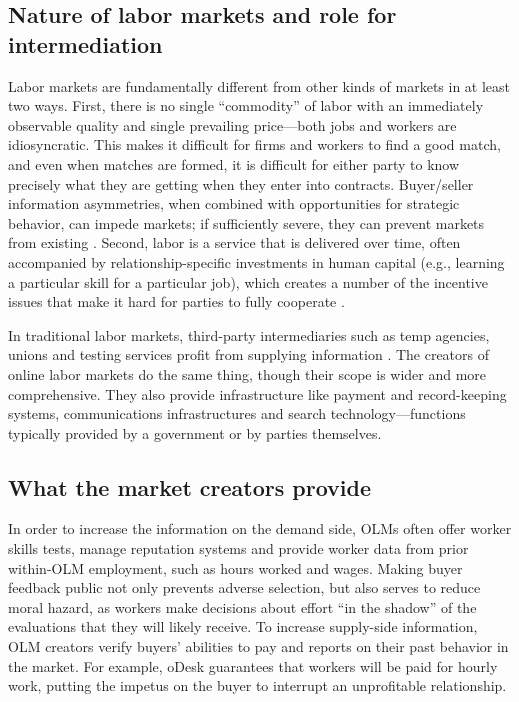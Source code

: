 \documentclass{llncs}
\begin{document}
\subsection{Nature of labor markets and role for intermediation}
Labor markets are fundamentally different from other kinds of markets
in at least two ways. First, there is no single ``commodity'' of labor
with an immediately observable quality and single prevailing
price---both jobs and workers are idiosyncratic.  This makes it
difficult for firms and workers to find a good match, and even when
matches are formed, it is difficult for either party to know precisely
what they are getting when they enter into contracts. Buyer/seller
information asymmetries, when combined with opportunities for
strategic behavior, can impede markets; if sufficiently severe, they can 
prevent markets from existing
\cite{akerlof1970market}\cite{rothschild1976equilibrium}. Second,
labor is a service that is delivered over time, often accompanied by
relationship-specific investments in human capital (e.g., learning a
particular skill for a particular job), which creates a number of the
incentive issues that make it hard for parties to fully
cooperate \cite{williamson1979}.

In traditional labor markets, third-party intermediaries
such as temp agencies, unions and testing services profit from
supplying information \cite{autor08}. The creators of online labor
markets do the same thing, though their scope is wider and more
comprehensive. They also provide infrastructure like payment and
record-keeping systems, communications infrastructures and search
technology---functions typically provided by a government or by
parties themselves.

\subsection{What the market creators provide}
In order to increase the information on the demand side, OLMs
often offer worker skills tests, manage reputation systems and provide
worker data from prior within-OLM employment, such as hours worked and
wages.  Making buyer feedback public not only prevents adverse
selection, but also serves to reduce moral hazard, as workers make
decisions about effort ``in the shadow'' of the evaluations that they
will likely receive. To increase supply-side information, OLM creators verify buyers' abilities to pay and
reports on their past behavior in the market. For example, oDesk
guarantees that workers will be paid for hourly work, putting the
impetus on the buyer to interrupt an unprofitable relationship.
\end{document}

